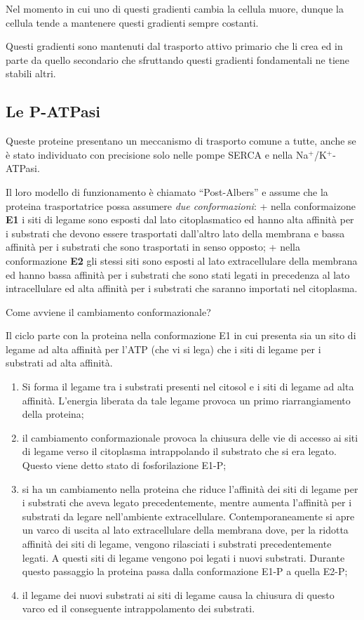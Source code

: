 \documentclass[]{article}
\begin{document}
Nel momento in cui uno di questi gradienti cambia la cellula muore,
dunque la cellula tende a mantenere questi gradienti sempre costanti.

Questi gradienti sono mantenuti dal trasporto attivo primario che li
crea ed in parte da quello secondario che sfruttando questi gradienti
fondamentali ne tiene stabili altri.

\subsection{Le P-ATPasi}\label{le-p-atpasi}

Queste proteine presentano un meccanismo di trasporto comune a tutte,
anche se è stato individuato con precisione solo nelle pompe SERCA e
nella Na\(^+\)/K\(^+\)-ATPasi.

Il loro modello di funzionamento è chiamato ``Post-Albers'' e assume che
la proteina trasportatrice possa assumere \emph{due conformazioni}: +
nella conformaizone \textbf{E1} i siti di legame sono esposti dal lato
citoplasmatico ed hanno alta affinità per i substrati che devono essere
trasportati dall'altro lato della membrana e bassa affinità per i
substrati che sono trasportati in senso opposto; + nella conformazione
\textbf{E2} gli stessi siti sono esposti al lato extracellulare della
membrana ed hanno bassa affinità per i substrati che sono stati legati
in precedenza al lato intracellulare ed alta affinità per i substrati
che saranno importati nel citoplasma.

Come avviene il cambiamento conformazionale?

Il ciclo parte con la proteina nella conformazione E1 in cui presenta
sia un sito di legame ad alta affinità per l'ATP (che vi si lega) che i
siti di legame per i substrati ad alta affinità.

\begin{enumerate}
\def\labelenumi{\arabic{enumi}.}
\itemsep1pt\parskip0pt
\item
  Si forma il legame tra i substrati presenti nel citosol e i siti di
  legame ad alta affinità. L'energia liberata da tale legame provoca un
  primo riarrangiamento della proteina;
\item
  il cambiamento conformazionale provoca la chiusura delle vie di
  accesso ai siti di legame verso il citoplasma intrappolando il
  substrato che si era legato. Questo viene detto stato di
  fosforilazione E1-P;
\item
  si ha un cambiamento nella proteina che riduce l'affinità dei siti di
  legame per i substrati che aveva legato precedentemente, mentre
  aumenta l'affinità per i substrati da legare nell'ambiente
  extracellulare. Contemporaneamente si apre un varco di uscita al lato
  extracellulare della membrana dove, per la ridotta affinità dei siti
  di legame, vengono rilasciati i substrati precedentemente legati. A
  questi siti di legame vengono poi legati i nuovi substrati. Durante
  questo passaggio la proteina passa dalla conformazione E1-P a quella
  E2-P;
\item
  il legame dei nuovi substrati ai siti di legame causa la chiusura di
  questo varco ed il conseguente intrappolamento dei substrati.
\end{enumerate}
\end{document}
